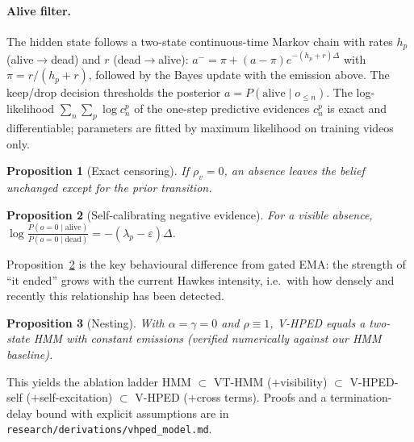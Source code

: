 \documentclass[10pt]{article}
\newtheorem{proposition}{Proposition}
\begin{document}
\paragraph{Alive filter.} The hidden state follows a two-state continuous-time
Markov chain with rates $h_p$ (alive$\to$dead) and $r$ (dead$\to$alive):
$a^- = \pi + (a-\pi)e^{-(h_p+r)\Delta}$ with $\pi=r/(h_p+r)$, followed by the
Bayes update with the emission above. The keep/drop decision thresholds the
posterior $a=P(\text{alive}\mid o_{\le n})$. The log-likelihood
$\sum_n\sum_p \log c_n^p$ of the one-step predictive evidences $c_n^p$ is
exact and differentiable; parameters are fitted by maximum likelihood on
training videos only.

\begin{proposition}[Exact censoring]\label{prop:censor}
If $\rho_v=0$, an absence leaves the belief unchanged except for the prior
transition.
\end{proposition}
\begin{proposition}[Self-calibrating negative evidence]\label{prop:evidence}
For a visible absence, $\log \frac{P(o=0\mid\text{alive})}{P(o=0\mid\text{dead})}
=-(\lambda_p-\varepsilon)\Delta$.
\end{proposition}
Proposition~\ref{prop:evidence} is the key behavioural difference from
gated EMA: the strength of ``it ended'' grows with the current Hawkes
intensity, i.e.\ with how densely and recently this relationship has been
detected.
\begin{proposition}[Nesting]\label{prop:nest}
With $\alpha=\gamma=0$ and $\rho\equiv 1$, V-HPED equals a two-state HMM
with constant emissions (verified numerically against our HMM baseline).
\end{proposition}
This yields the ablation ladder HMM $\subset$ VT-HMM ($+$visibility)
$\subset$ V-HPED-self ($+$self-excitation) $\subset$ V-HPED ($+$cross terms).
Proofs and a termination-delay bound with explicit assumptions are in
\texttt{research/derivations/vhped\_model.md}.
\end{document}
